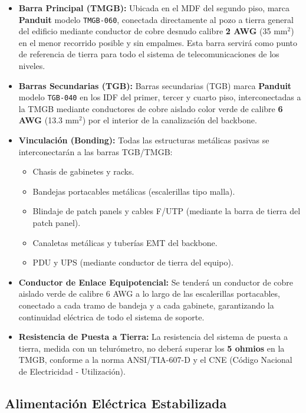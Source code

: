 \begin{itemize}
    \item \textbf{Barra Principal (TMGB):} Ubicada en el MDF del segundo piso, marca \textbf{Panduit} modelo \texttt{TMGB-060}, conectada directamente al pozo a tierra general del edificio mediante conductor de cobre desnudo calibre \textbf{2 AWG} (35 mm$^2$) en el menor recorrido posible y sin empalmes. Esta barra servirá como punto de referencia de tierra para todo el sistema de telecomunicaciones de los \totalPisos{} niveles.
    \item \textbf{Barras Secundarias (TGB):} Barras secundarias (TGB) marca \textbf{Panduit} modelo \texttt{TGB-040} en los IDF del primer, tercer y cuarto piso, interconectadas a la TMGB mediante conductores de cobre aislado color verde de calibre \textbf{6 AWG} (13.3 mm$^2$) por el interior de la canalización del backbone.
    \item \textbf{Vinculación (Bonding):} Todas las estructuras metálicas pasivas se interconectarán a las barras TGB/TMGB:
        \begin{itemize}
            \item Chasis de gabinetes y racks.
            \item Bandejas portacables metálicas (escalerillas tipo malla).
            \item Blindaje de patch panels y cables F/UTP (mediante la barra de tierra del patch panel).
            \item Canaletas metálicas y tuberías EMT del backbone.
            \item PDU y UPS (mediante conductor de tierra del equipo).
        \end{itemize}
    \item \textbf{Conductor de Enlace Equipotencial:} Se tenderá un conductor de cobre aislado verde de calibre 6 AWG a lo largo de las escalerillas portacables, conectado a cada tramo de bandeja y a cada gabinete, garantizando la continuidad eléctrica de todo el sistema de soporte.
    \item \textbf{Resistencia de Puesta a Tierra:} La resistencia del sistema de puesta a tierra, medida con un telurómetro, no deberá superar los \textbf{5 ohmios} en la TMGB, conforme a la norma ANSI/TIA-607-D y el CNE (Código Nacional de Electricidad - Utilización).
\end{itemize}

\subsection*{Alimentación Eléctrica Estabilizada}

